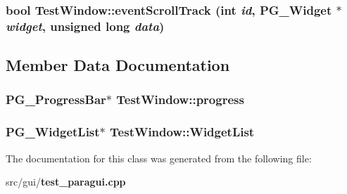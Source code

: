 \subsubsection{\setlength{\rightskip}{0pt plus 5cm}bool Test\-Window::event\-Scroll\-Track (int {\em id}, PG\_\-Widget $\ast$ {\em widget}, unsigned long {\em data})}\label{classTestWindow_a4}




\subsection{Member Data Documentation}
\subsubsection{\setlength{\rightskip}{0pt plus 5cm}PG\_\-Progress\-Bar$\ast$ {\bf Test\-Window::progress}\hspace{0.3cm}{\tt  [private]}}\label{classTestWindow_r0}


\subsubsection{\setlength{\rightskip}{0pt plus 5cm}PG\_\-Widget\-List$\ast$ {\bf Test\-Window::Widget\-List}\hspace{0.3cm}{\tt  [private]}}\label{classTestWindow_r1}




The documentation for this class was generated from the following file:\begin{CompactItemize}
\item 
src/gui/{\bf test\_\-paragui.cpp}\end{CompactItemize}
